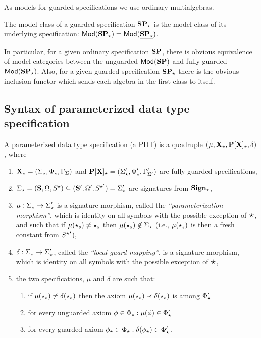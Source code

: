 As models for guarded specifications we use ordinary multialgebras.
\begin{definition}
The model class of a guarded specification ${\bf SP_\star}$ is the
model class of its underlying specification: ${\sf {Mod}}({\bf SP_\star}) = {\sf {Mod}}(\underline{{\bf SP_\star}})$.
\end{definition}
In particular, for a given ordinary specification ${\bf SP}$, there is obvious equivalence of
model categories between the unguarded ${\sf {Mod}}({\bf SP})$ and fully guarded ${\sf {Mod}}({\bf SP_\star})$.
Also, for a given guarded specification ${\bf SP_\star}$ there is the obvious
inclusion functor
which sends each algebra in the first class to itself.


\subsection{Syntax of parameterized data type specification}
\begin{definition}\label{def:parametersyntax}
A parameterized data type specification (a PDT) is a
 quadruple $(\mu,{\bf X_\star},{\bf P[X]_\star},\delta)$,
where
\begin{enumerate}\MyLPar
\item 
${\bf X_\star}=(\Sigma_\star,\Phi_\star, \Gamma_\Sigma)$ and ${\bf P[X]_\star} =
 (\Sigma'_{\star},\Phi'_{\star}, \Gamma'_{\Sigma'})$ are fully guarded specifications,
\item 
$\Sigma_\star=({\bf S},\Omega,S^\star)\subseteq
({\bf S}',\Omega',S^{\star'})=\Sigma'_\star$ are signatures from ${\bf Sign_\star}$, 
\item 
$\mu:\Sigma_\star\to \Sigma'_\star$ is a signature morphism, called the {\em
``parameterization morphism''}, which is identity on all symbols with the
possible exception of $\mbox{\Large{$\star$}}$, and such that if $\mu(\star_s)\not=\star_s$
then $\mu(\star_s)\not\in\Sigma_\star$ (i.e., $\mu(\star_s)$ is then a fresh
constant from ${S^\star}'$),
\item 
$\delta:\Sigma_\star\to\Sigma'_\star$, called the {\em ``local guard mapping''}, is 
a signature morphism, which is identity on all symbols with the
possible exception of $\mbox{\Large{$\star$}}$,
\item\label{it:rel}
 the two specifications, $\mu$ and $\delta$ are such that:
\begin{enumerate}
\item\label{it:sat} if $\mu(\star_s)\not=\delta(\star_s)$ then the axiom
$\mu(\star_s)\prec\delta(\star_s)$ is among $\Phi'_\star$
\item\label{it:unguard} for every unguarded axiom $\phi\in\Phi_\star:\mu(\phi)\in\Phi'_\star$
\item\label{it:corax} for every guarded axiom  $\phi_\star\in\Phi_\star:
\delta(\phi_\star)\in\Phi'_\star$.
\end{enumerate}
\end{enumerate}
\end{definition}
